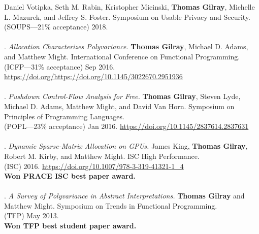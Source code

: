 Daniel Votipka, Seth M. Rabin, Kristopher Micinski, \textbf{Thomas Gilray}, Michelle L. Mazurek, and Jeffrey S. Foster.
Symposium on Usable Privacy and Security.
\\(SOUPS---21\% acceptance) 2018.
\\ \vspace{-0.1cm}\\
\paper. \textit{Allocation Characterizes Polyvariance.}
\textbf{Thomas Gilray}, Michael D. Adams, and Matthew Might.
International Conference on Functional Programming.
\\(ICFP---31\% acceptance) Sep 2016. \url{https://doi.org/https://doi.org/10.1145/3022670.2951936}
\\ \vspace{-0.1cm}\\
\paper. \textit{Pushdown Control-Flow Analysis for Free.}
\textbf{Thomas Gilray}, Steven Lyde, Michael D. Adams, Matthew Might, and David Van Horn.
Symposium on Principles of Programming Languages.
\\(POPL---23\% acceptance) Jan 2016. \url{https://doi.org/10.1145/2837614.2837631}
\\ \vspace{-0.1cm}\\
\paper. \textit{Dynamic Sparse-Matrix Allocation on GPUs.}
James King, \textbf{Thomas Gilray}, Robert M. Kirby, and Matthew Might.
ISC High Performance.
\\(ISC) 2016. \url{https://doi.org/10.1007/978-3-319-41321-1_4}
\\\textbf{Won PRACE ISC best paper award.} \\ \vspace{-0.1cm}\\
\paper. \textit{A Survey of Polyvariance in Abstract Interpretations.}
\textbf{Thomas Gilray} and Matthew Might.
Symposium on Trends in Functional Programming.
\\(TFP) May 2013.
\\\textbf{Won TFP best student paper award.} \\ \vspace{-0.1cm}\\
